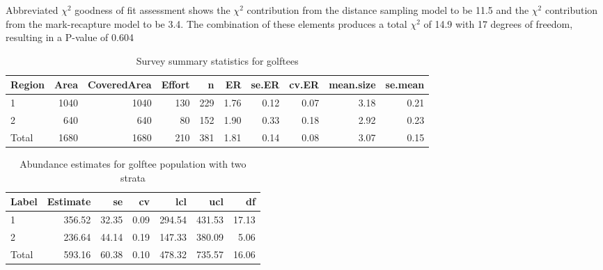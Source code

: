 \documentclass[]{book}
\newenvironment{Shaded}{\begin{snugshade}}{\end{snugshade}}
\newcommand{\KeywordTok}[1]{\textcolor[rgb]{0.13,0.29,0.53}{\textbf{#1}}}
\newcommand{\DataTypeTok}[1]{\textcolor[rgb]{0.13,0.29,0.53}{#1}}
\newcommand{\DecValTok}[1]{\textcolor[rgb]{0.00,0.00,0.81}{#1}}
\newcommand{\StringTok}[1]{\textcolor[rgb]{0.31,0.60,0.02}{#1}}
\newcommand{\CommentTok}[1]{\textcolor[rgb]{0.56,0.35,0.01}{\textit{#1}}}
\newcommand{\OperatorTok}[1]{\textcolor[rgb]{0.81,0.36,0.00}{\textbf{#1}}}
\newcommand{\NormalTok}[1]{#1}
\theoremstyle{definition}
\theoremstyle{definition}
\theoremstyle{remark}
\begin{document}
Abbreviated \(\chi^2\) goodness of fit assessment shows the \(\chi^2\)
contribution from the distance sampling model to be 11.5 and the
\(\chi^2\) contribution from the mark-recapture model to be 3.4. The
combination of these elements produces a total \(\chi^2\) of 14.9 with
17 degrees of freedom, resulting in a P-value of 0.604

\begin{Shaded}
\end{Shaded}

\begin{table}

\caption{\label{tab:abund-from-dist}Survey summary statistics for golftees}
\centering
\begin{tabular}[t]{l|r|r|r|r|r|r|r|r|r}
\hline
Region & Area & CoveredArea & Effort & n & ER & se.ER & cv.ER & mean.size & se.mean\\
\hline
1 & 1040 & 1040 & 130 & 229 & 1.76 & 0.12 & 0.07 & 3.18 & 0.21\\
\hline
2 & 640 & 640 & 80 & 152 & 1.90 & 0.33 & 0.18 & 2.92 & 0.23\\
\hline
Total & 1680 & 1680 & 210 & 381 & 1.81 & 0.14 & 0.08 & 3.07 & 0.15\\
\hline
\end{tabular}
\end{table}

\begin{Shaded}
\end{Shaded}

\begin{table}

\caption{\label{tab:abund-from-dist}Abundance estimates for golftee population with two strata}
\centering
\begin{tabular}[t]{l|r|r|r|r|r|r}
\hline
Label & Estimate & se & cv & lcl & ucl & df\\
\hline
1 & 356.52 & 32.35 & 0.09 & 294.54 & 431.53 & 17.13\\
\hline
2 & 236.64 & 44.14 & 0.19 & 147.33 & 380.09 & 5.06\\
\hline
Total & 593.16 & 60.38 & 0.10 & 478.32 & 735.57 & 16.06\\
\hline
\end{tabular}
\end{table}
\end{document}
